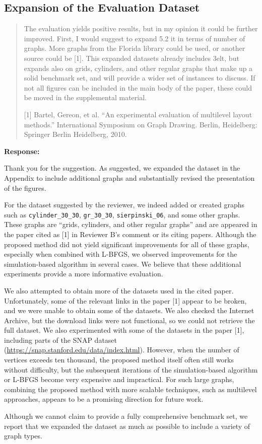 \documentclass[11pt]{article}
\newcommand{\reviewercomment}[1]{%
  \begin{quote}
  \color{blue}
  #1
  \end{quote}
}
\newenvironment{response}{%
  \noindent\textbf{Response:}%
}{%
  \medskip
}
\begin{document}
\subsection{Expansion of the Evaluation Dataset}

\reviewercomment{
  The evaluation yields positive results, but in my opinion it could be further improved.
  First, I would suggest to expand 5.2 it in terms of number of graphs.
  More graphs from the Florida library could be used, or another source could be [1].
  This expanded datasets already includes 3elt, but expands also on grids, cylinders, and other regular graphs that make up a solid benchmark set, and will provide a wider set of instances to discuss.
  If not all figures can be included in the main body of the paper, these could be moved in the supplemental material.

    [1] Bartel, Gereon, et al. ``An experimental evaluation of multilevel layout methods.'' International Symposium on Graph Drawing. Berlin, Heidelberg: Springer Berlin Heidelberg, 2010.
}

\begin{response}
  Thank you for the suggestion.
  As suggested, we expanded the dataset in the Appendix to include additional graphs and substantially revised the presentation of the figures.

  For the dataset suggested by the reviewer, we indeed added or created graphs such as \texttt{cylinder\_30\_30}, \texttt{gr\_30\_30}, \texttt{sierpinski\_06}, and some other graphs.
  These graphs are ``grids, cylinders, and other regular graphs'' and are appeared in the paper cited as [1] in Reviewer B's comment or its citing papers.
  Although the proposed method did not yield significant improvements for all of these graphs, especially when combined with L-BFGS, we observed improvements for the simulation-based algorithm in several cases. We believe that these additional experiments provide a more informative evaluation.

  We also attempted to obtain more of the datasets used in the cited paper.
  Unfortunately, some of the relevant links in the paper [1] appear to be broken, and we were unable to obtain some of the datasets. We also checked the Internet Archive, but the download links were not functional, so we could not retrieve the full dataset.
  We also experimented with some of the datasets in the paper [1], including parts of the SNAP dataset (\url{https://snap.stanford.edu/data/index.html}). However, when the number of vertices exceeds ten thousand, the proposed method itself often still works without difficulty, but the subsequent iterations of the simulation-based algorithm or L-BFGS become very expensive and impractical.
  For such large graphs, combining the proposed method with more scalable techniques, such as multilevel approaches, appears to be a promising direction for future work.

  Although we cannot claim to provide a fully comprehensive benchmark set, we report that we expanded the dataset as much as possible to include a variety of graph types.
\end{response}
\end{document}
